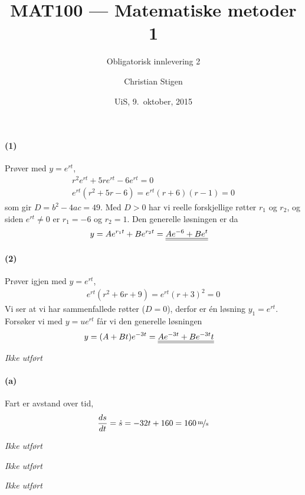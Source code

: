 \documentclass[a4paper,norsk,12pt]{article}
\title{MAT100 --- Matematiske metoder 1}
\subtitle{Obligatorisk innlevering 2}
\author{Christian Stigen}
\date{UiS, 9.~oktober, 2015}
\begin{document}
\maketitle

\paragraph{(1)} Prøver med $y=e^{rt}$,
\begin{equation*}
  \begin{split}
    r^2e^{rt} + 5re^{rt} - 6e^{rt} = 0 \\
    e^{rt}(r^2+5r-6) = e^{rt}(r+6)(r-1) = 0
  \end{split}
\end{equation*}
%
som gir $D = b^2 - 4ac = 49$. Med $D > 0$ har vi reelle forskjellige røtter
$r_1$ og $r_2$, og siden $e^{rt} \neq 0$ er $r_1=-6$ og $r_2=1$. Den generelle
løsningen er da
%
\begin{equation*}
  \begin{split}
    y & = Ae^{r_1t} + Be^{r_2t} = {\underline{\underline{Ae^{-6} + Be^t}}}
  \end{split}
\end{equation*}

\paragraph{(2)} Prøver igjen med $y=e^{rt}$,
\begin{equation*}
  \begin{split}
    e^{rt}(r^2 + 6r + 9) = e^{rt}(r+3)^2 = 0
  \end{split}
\end{equation*}
Vi ser at vi har sammenfallede røtter ($D=0$), derfor er én løsning $y_1 =
e^{rt}$. Forsøker vi med $y = ue^{rt}$ får vi den generelle løsningen
\begin{equation*}
  \begin{split}
    y & = (A + Bt)e^{-3t} = {\underline{\underline{Ae^{-3t} + Be^{-3t}t}}}
  \end{split}
\end{equation*}

\textit{Ikke utført}

\paragraph{(a)}
Fart er avstand over tid,
\begin{equation*}
  \begin{split}
    \frac{ds}{dt} = \dot{s} = -32t + 160 = \unitfrac[160]{m}{s}
  \end{split}
\end{equation*}

\textit{Ikke utført}

\textit{Ikke utført}

\textit{Ikke utført}
\end{document}
